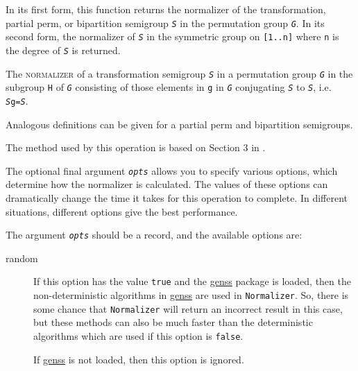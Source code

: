 \documentclass[a4paper,11pt]{report}
\begin{document}
{{{ In its first form, this function returns the normalizer of the transformation,
partial perm, or bipartition semigroup \mbox{\texttt{\mdseries\slshape S}} in the permutation group \mbox{\texttt{\mdseries\slshape G}}. In its second form, the normalizer of \mbox{\texttt{\mdseries\slshape S}} in the symmetric group on \texttt{[1..n]} where \texttt{n} is the degree of \mbox{\texttt{\mdseries\slshape S}} is returned.

 The \textsc{normalizer} of a transformation semigroup \mbox{\texttt{\mdseries\slshape S}} in a permutation group \mbox{\texttt{\mdseries\slshape G}} in the subgroup \texttt{H} of \mbox{\texttt{\mdseries\slshape G}} consisting of those elements in \texttt{g} in \mbox{\texttt{\mdseries\slshape G}} conjugating \mbox{\texttt{\mdseries\slshape S}} to \mbox{\texttt{\mdseries\slshape S}}, i.e. \texttt{\mbox{\texttt{\mdseries\slshape S}}\texttt{}g=\mbox{\texttt{\mdseries\slshape S}}}. 

 Analogous definitions can be given for a partial perm and bipartition
semigroups.

 The method used by this operation is based on Section 3 in \cite{Araujo2010aa}.

 The optional final argument \mbox{\texttt{\mdseries\slshape opts}} allows you to specify various options, which determine how the normalizer is
calculated. The values of these options can dramatically change the time it
takes for this operation to complete. In different situations, different
options give the best performance. 

 The argument \mbox{\texttt{\mdseries\slshape opts}} should be a record, and the available options are: 
\begin{description}
\item[{random}]  If this option has the value \texttt{true} and the \href{ http://www-groups.mcs.st-and.ac.uk/~neunhoef/Computer/Software/Gap/genss.html } {genss} package is loaded, then the non-deterministic algorithms in \href{ http://www-groups.mcs.st-and.ac.uk/~neunhoef/Computer/Software/Gap/genss.html } {genss} are used in \texttt{Normalizer}. So, there is some chance that \texttt{Normalizer} will return an incorrect result in this case, but these methods can also be
much faster than the deterministic algorithms which are used if this option is \texttt{false}. 

 If \href{ http://www-groups.mcs.st-and.ac.uk/~neunhoef/Computer/Software/Gap/genss.html } {genss} is not loaded, then this option is ignored. 


\end{description}}}}
\end{document}
